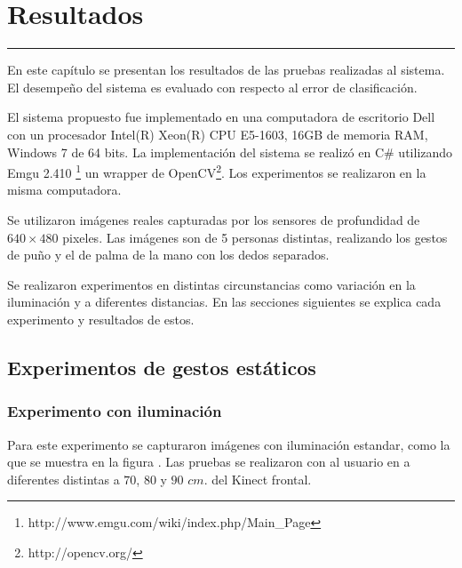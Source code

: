 \chapter{Resultados}\label{capit:cap5}
\vspace{-2.0325ex}%
\noindent
\rule{\textwidth}{0.5pt}
\vspace{-5.5ex}%
\newcommand{\pushline}{\Indp}%

En este capítulo se presentan los resultados de las pruebas realizadas al sistema. El desempeño del sistema es evaluado con respecto al error de clasificación.   

El sistema propuesto fue implementado en una computadora de escritorio Dell con un procesador Intel(R) Xeon(R) CPU E5-1603, 16GB de memoria RAM, Windows 7 de 64 bits. La implementación del sistema se realizó en C\# utilizando Emgu 2.410 \footnote{http://www.emgu.com/wiki/index.php/Main\_Page} un wrapper de OpenCV\footnote{http://opencv.org/}. Los experimentos se realizaron en la misma computadora. 

Se utilizaron imágenes reales capturadas por los sensores de profundidad de $640 \times 480$ pixeles. Las imágenes son de 5 personas distintas, realizando los gestos de puño y el de palma de la mano con los dedos separados.   

Se realizaron experimentos en distintas circunstancias como variación en la iluminación y a diferentes distancias. En las secciones siguientes se explica cada experimento y resultados de estos.  

\section{Experimentos de gestos estáticos}\label{TestStaticGestures}  

\subsection{Experimento con iluminación} 
Para este experimento se capturaron imágenes con iluminación estandar, como la que se muestra en la figura . Las pruebas se realizaron con al usuario en a diferentes distintas a $70$, $80$ y $90$ $cm.$ del Kinect frontal. 

